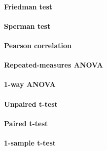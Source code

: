 \paragraph{Friedman test}
\paragraph{Sperman test}
\paragraph{Pearson correlation}
\paragraph{Repeated-measures ANOVA}
\paragraph{1-way ANOVA}
\paragraph{Unpaired t-test}
\paragraph{Paired t-test}
\paragraph{1-sample t-test}
